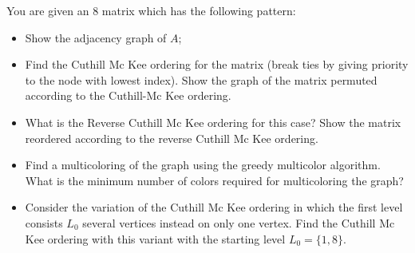 \documentclass{ctexart}
\begin{document}
\begin{problem} 
  You are given an \(8 \) matrix which has the following pattern: 
  \begin{itemize}
    \item Show the adjacency graph of \(A \);
    \item Find the Cuthill Mc Kee ordering for the matrix (break ties by 
      giving priority to the node with lowest index). Show the graph of 
      the matrix permuted according to the Cuthill-Mc Kee ordering.
    \item What is the Reverse Cuthill Mc Kee ordering for this case? Show the matrix 
      reordered according to the reverse Cuthill Mc Kee ordering.
    \item Find a multicoloring of the graph using the greedy multicolor 
      algorithm. What is the minimum number of colors required for multicoloring 
      the graph? 
    \item Consider the variation of the Cuthill Mc Kee ordering in which the 
      first level consists \(L_0 \) several vertices instead on only one vertex. 
      Find the Cuthill Mc Kee ordering with this variant with the starting level 
      \(L_0 = \{1,8\} \).
  \end{itemize}
\end{problem}
  
\end{document}

